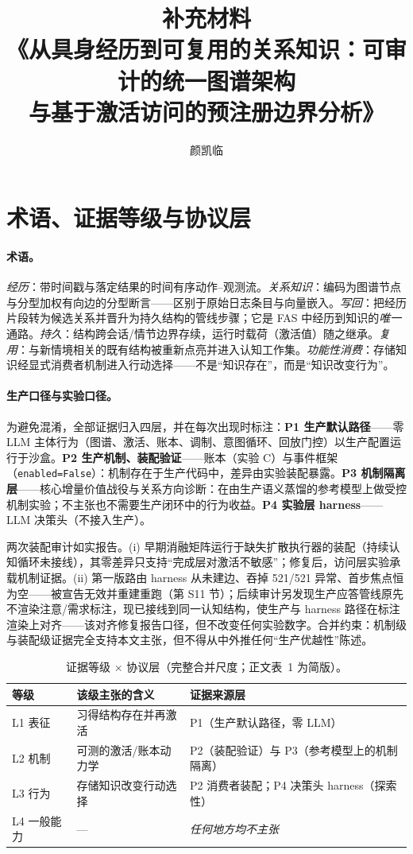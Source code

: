 \documentclass[10pt,a4paper]{ctexart}
\title{\bfseries 补充材料\\
《从具身经历到可复用的关系知识：可审计的统一图谱架构\\与基于激活访问的预注册边界分析》}
\author{颜凯临}
\date{}
\begin{document}
\maketitle

\section{术语、证据等级与协议层}
\label{s1:term}

\paragraph{术语。}\emph{经历}：带时间戳与落定结果的时间有序动作--观测流。\emph{关系知识}：编码为图谱节点与分型加权有向边的分型断言——区别于原始日志条目与向量嵌入。\emph{写回}：把经历片段转为候选关系并晋升为持久结构的管线步骤；它是 FAS 中经历到知识的\emph{唯一}通路。\emph{持久}：结构跨会话/情节边界存续，运行时载荷（激活值）随之继承。\emph{复用}：与新情境相关的既有结构被重新点亮并进入认知工作集。\emph{功能性消费}：存储知识经显式消费者机制进入行动选择——不是“知识存在”，而是“知识改变行为”。

\paragraph{生产口径与实验口径。}为避免混淆，全部证据归入四层，并在每次出现时标注：\textbf{P1 生产默认路径}——零 LLM 主体行为（图谱、激活、账本、调制、意图循环、回放门控）以生产配置运行于沙盒。\textbf{P2 生产机制、装配验证}——账本（实验 C）与事件框架（\texttt{enabled=False}）：机制存在于生产代码中，差异由实验装配暴露。\textbf{P3 机制隔离层}——核心增量价值战役与关系方向诊断：在由生产语义蒸馏的参考模型上做受控机制实验；不主张也不需要生产闭环中的行为收益。\textbf{P4 实验层 harness}——LLM 决策头（不接入生产）。

两次装配审计如实报告。(i) 早期消融矩阵运行于缺失扩散执行器的装配（持续认知循环未接线），其零差异只支持“完成层对激活不敏感”；修复后，访问层实验承载机制证据。(ii) 第一版路由 harness 从未建边、吞掉 521/521 异常、首步焦点恒为空——被宣告无效并重建重跑（第 S11 节）；后续审计另发现生产应答管线原先不渲染注意/需求标注，现已接线到同一认知结构，使生产与 harness 路径在标注渲染上对齐——该对齐修复报告口径，但不改变任何实验数字。合并约束：机制级与装配级证据完全支持本文主张，但不得从中外推任何“生产优越性”陈述。

\begin{table}[h]
\centering\small
\caption{证据等级 $\times$ 协议层（完整合并尺度；正文表~1 为简版）。}
\label{tab:s-evidence}
\begin{tabular}{L{3.4cm}L{4.8cm}L{6.4cm}}
\toprule
\textbf{等级} & \textbf{该级主张的含义} & \textbf{证据来源层} \\
\midrule
L1 表征 & 习得结构存在并再激活 & P1（生产默认路径，零 LLM） \\
L2 机制 & 可测的激活/账本动力学 & P2（装配验证）与 P3（参考模型上的机制隔离） \\
L3 行为 & 存储知识改变行动选择 & P2 消费者装配；P4 决策头 harness（探索性） \\
L4 一般能力 & --- & \emph{任何地方均不主张} \\
\bottomrule
\end{tabular}
\end{table}
\end{document}
